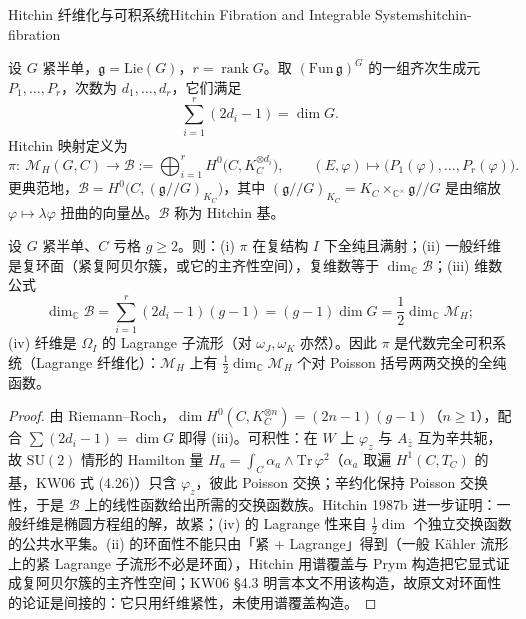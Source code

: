 \begin{centry}{Hitchin 纤维化与可积系统}{Hitchin Fibration and Integrable Systems}{hitchin-fibration}

\begin{definition}[Hitchin 映射]
设 $G$ 紧半单，$\mathfrak g=\mathrm{Lie}(G)$，$r=\operatorname{rank}G$。取 $(\mathrm{Fun}\,\mathfrak g)^{G}$ 的一组齐次生成元 $P_{1},\dots,P_{r}$，次数为 $d_{1},\dots,d_{r}$，它们满足
\[
\sum_{i=1}^{r}(2d_{i}-1)=\dim G .
\]
Hitchin 映射定义为
\[
\pi:\ \mathcal M_{H}(G,C)\longrightarrow \mathcal B:=\bigoplus_{i=1}^{r}H^{0}\bigl(C,K_{C}^{\otimes d_{i}}\bigr),
\qquad
(E,\varphi)\longmapsto\bigl(P_{1}(\varphi),\dots,P_{r}(\varphi)\bigr).
\]
更典范地，$\mathcal B=H^{0}\bigl(C,(\mathfrak g/\!/G)_{K_{C}}\bigr)$，其中 $(\mathfrak g/\!/G)_{K_{C}}=K_{C}\times_{\mathbb C^{\times}}\mathfrak g/\!/G$ 是由缩放 $\varphi\mapsto\lambda\varphi$ 扭曲的向量丛。$\mathcal B$ 称为 Hitchin 基。
\end{definition}

\begin{theorem}
设 $G$ 紧半单、$C$ 亏格 $g\ge2$。则：(i) $\pi$ 在复结构 $I$ 下全纯且满射；(ii) 一般纤维是复环面（紧复阿贝尔簇，或它的主齐性空间），复维数等于 $\dim_{\mathbb C}\mathcal B$；(iii) 维数公式
\[
\dim_{\mathbb C}\mathcal B=\sum_{i=1}^{r}(2d_{i}-1)(g-1)=(g-1)\dim G=\frac12\dim_{\mathbb C}\mathcal M_{H};
\]
(iv) 纤维是 $\Omega_{I}$ 的 Lagrange 子流形（对 $\omega_{J},\omega_{K}$ 亦然）。因此 $\pi$ 是代数完全可积系统（Lagrange 纤维化）：$\mathcal M_{H}$ 上有 $\frac12\dim_{\mathbb C}\mathcal M_{H}$ 个对 Poisson 括号两两交换的全纯函数。
\end{theorem}
\begin{proof}
由 Riemann--Roch，$\dim H^{0}(C,K_{C}^{\otimes n})=(2n-1)(g-1)$（$n\ge1$），配合 $\sum(2d_{i}-1)=\dim G$ 即得 (iii)。可积性：在 $W$ 上 $\varphi_{z}$ 与 $A_{\bar z}$ 互为辛共轭，故 $\mathrm{SU}(2)$ 情形的 Hamilton 量 $H_{a}=\int_{C}\alpha_{a}\wedge\mathrm{Tr}\,\varphi^{2}$（$\alpha_{a}$ 取遍 $H^{1}(C,T_{C})$ 的基，KW06 式 (4.26)）只含 $\varphi_{z}$，彼此 Poisson 交换；辛约化保持 Poisson 交换性，于是 $\mathcal B$ 上的线性函数给出所需的交换函数族。Hitchin 1987b 进一步证明：一般纤维是椭圆方程组的解，故紧；(iv) 的 Lagrange 性来自 $\frac12\dim$ 个独立交换函数的公共水平集。(ii) 的环面性不能只由「紧 + Lagrange」得到（一般 K\"ahler 流形上的紧 Lagrange 子流形不必是环面），Hitchin 用谱覆盖与 Prym 构造把它显式证成复阿贝尔簇的主齐性空间；KW06 §4.3 明言本文不用该构造，故原文对环面性的论证是间接的：它只用纤维紧性，未使用谱覆盖构造。
\end{proof}


\end{centry}
